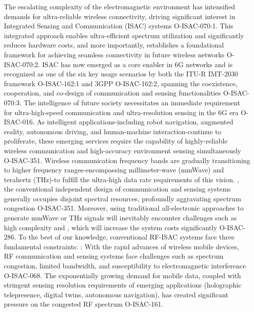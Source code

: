 \markdownRendererDocumentBegin
\markdownRendererSectionBegin
{}\markdownRendererInterblockSeparator
{}\markdownRendererSectionBegin
{}\markdownRendererInterblockSeparator
{}The escalating complexity of the electromagnetic environment has intensified demands for ultra-reliable wireless connectivity, driving significant interest in Integrated Sensing and Communication (ISAC) systems O-ISAC-070:1. This integrated approach enables ultra-efficient spectrum utilization and significantly reduces hardware costs, and more importantly, establishes a foundational framework for achieving seamless connectivity in future wireless networks O-ISAC-070:2. ISAC has now emerged as a core enabler in 6G networks and is recognized as one of the six key usage scenarios by both the ITU-R IMT-2030 framework O-ISAC-162:1 and 3GPP O-ISAC-162:2, spanning the coexistence, cooperation, and co-design of communication and sensing functionalities O-ISAC-070:3.\markdownRendererParagraphSeparator
{}The intelligence of future society necessitates an immediate requirement for ultra-high-speed communication and ultra-resolution sensing in the 6G era O-ISAC-016. As intelligent applications-including robot navigation, augmented reality, autonomous driving, and human-machine interaction-continue to proliferate, these emerging services require the capability of highly-reliable wireless communication and high-accuracy environment sensing simultaneously O-ISAC-351. Wireless communication frequency bands are gradually transitioning to higher frequency ranges-encompassing millimeter-wave (mmWave) and terahertz (THz)-to fulfill the ultra-high data rate requirements of this vision. , the conventional independent design of communication and sensing systems generally occupies disjoint spectral resources, profoundly aggravating spectrum congestion O-ISAC-351. Moreover, using traditional all-electronic approaches to generate mmWave or THz signals will inevitably encounter challenges such as high complexity and , which will increase the system costs significantly O-ISAC-286. To the best of our knowledge, conventional RF-ISAC systems face three fundamental constraints:\markdownRendererInterblockSeparator
{}\markdownRendererOlBegin
{}: With the rapid advances of wireless mobile devices, RF communication and sensing systems face challenges such as spectrum congestion, limited bandwidth, and susceptibility to electromagnetic interference O-ISAC-068. The exponentially growing demand for mobile data, coupled with stringent sensing resolution requirements of emerging applications (holographic telepresence, digital twins, autonomous navigation), has created significant pressure on the congested RF spectrum O-ISAC-161.\markdownRendererOlItemEnd 
